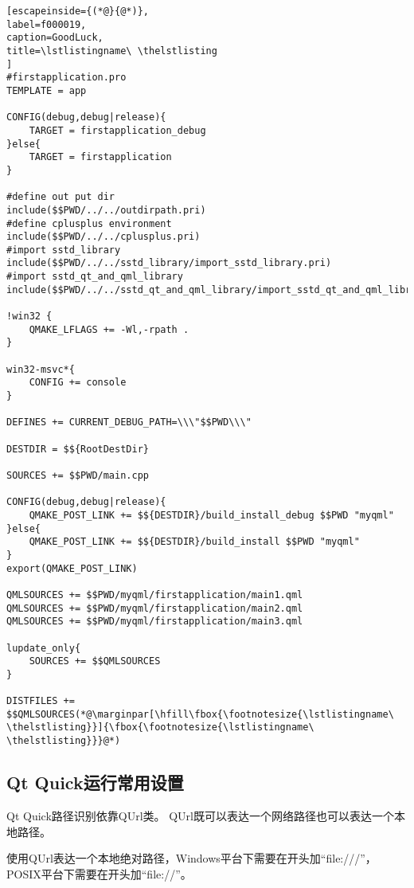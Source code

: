 \FloatBarrier
\begin{lstlisting}[escapeinside={(*@}{@*)},
label=f000019,
caption=GoodLuck,
title=\lstlistingname\ \thelstlisting
]
#firstapplication.pro
TEMPLATE = app

CONFIG(debug,debug|release){
    TARGET = firstapplication_debug
}else{
    TARGET = firstapplication
}

#define out put dir
include($$PWD/../../outdirpath.pri)
#define cplusplus environment
include($$PWD/../../cplusplus.pri)
#import sstd_library
include($$PWD/../../sstd_library/import_sstd_library.pri)
#import sstd_qt_and_qml_library
include($$PWD/../../sstd_qt_and_qml_library/import_sstd_qt_and_qml_library.pri)

!win32 {
    QMAKE_LFLAGS += -Wl,-rpath .
}

win32-msvc*{
    CONFIG += console
}

DEFINES += CURRENT_DEBUG_PATH=\\\"$$PWD\\\"

DESTDIR = $${RootDestDir}

SOURCES += $$PWD/main.cpp

CONFIG(debug,debug|release){
    QMAKE_POST_LINK += $${DESTDIR}/build_install_debug $$PWD "myqml"
}else{
    QMAKE_POST_LINK += $${DESTDIR}/build_install $$PWD "myqml"
}
export(QMAKE_POST_LINK)

QMLSOURCES += $$PWD/myqml/firstapplication/main1.qml
QMLSOURCES += $$PWD/myqml/firstapplication/main2.qml
QMLSOURCES += $$PWD/myqml/firstapplication/main3.qml

lupdate_only{
    SOURCES += $$QMLSOURCES
}

DISTFILES += $$QMLSOURCES(*@\marginpar[\hfill\fbox{\footnotesize{\lstlistingname\ \thelstlisting}}]{\fbox{\footnotesize{\lstlistingname\ \thelstlisting}}}@*)\end{lstlisting}          %


\FloatBarrier
\subsection{
Qt Quick运行常用设置
}\label{ss001v10}


Qt Quick路径识别依靠QUrl类。
QUrl既可以表达一个网络路径也可以表达一个本地路径。

使用QUrl表达一个本地绝对路径，Windows平台下需要在开头加“file:///”，
POSIX平台下需要在开头加“file://”。

